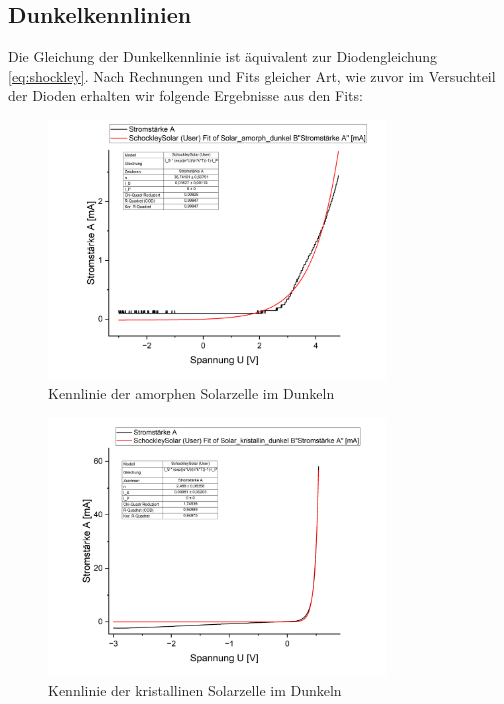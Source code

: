\documentclass[12pt,a4paper,ngerman]{report}
\begin{document}
		\subsection{Dunkelkennlinien}

		Die Gleichung der Dunkelkennlinie ist äquivalent zur Diodengleichung \ref{eq:shockley}. Nach Rechnungen und Fits gleicher Art, wie zuvor im Versuchteil der Dioden erhalten wir folgende Ergebnisse aus den Fits:

		\begin{figure}
			\centering
			\includegraphics[width=0.8\textwidth]{Origin/Solar_amorph_dunkel.png}
			\caption{Kennlinie der amorphen Solarzelle im Dunkeln}
			\label{fig:SolarAmorphDunkel}
		\end{figure}

		\begin{figure}
			\centering
			\includegraphics[width=0.8\textwidth]{Origin/Solar_kristallin_dunkel.png}
			\caption{Kennlinie der kristallinen Solarzelle im Dunkeln}
			\label{fig:SolarKristallinDunkel}
		\end{figure}
\end{document}
